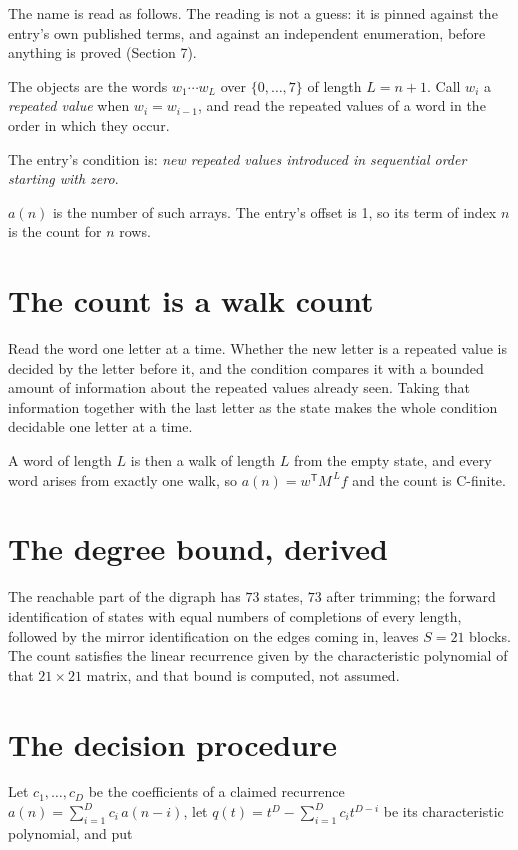 \documentclass[11pt]{article}
\theoremstyle{definition}
\begin{document}
The name is read as follows. The reading is not a guess: it is pinned against the entry's own published terms, and against an independent enumeration, before anything is proved (Section 7).

The objects are the words $w_1\cdots w_L$ over $\{0,\dots,7\}$ of length $L = n + 1$. Call $w_i$ a {\itshape repeated value} when $w_i = w_{i-1}$, and read the repeated values of a word in the order in which they occur.

The entry's condition is: {\itshape new repeated values introduced in sequential order starting with zero}.

$a(n)$ is the number of such arrays. The entry's offset is 1, so its term of index $n$ is the count for $n$ rows.

\section{The count is a walk count}

Read the word one letter at a time. Whether the new letter is a repeated value is decided by the letter before it, and the condition compares it with a bounded amount of information about the repeated values already seen. Taking that information together with the last letter as the state makes the whole condition decidable one letter at a time.

A word of length $L$ is then a walk of length $L$ from the empty state, and every word arises from exactly one walk, so $a(n) = w^{\mathsf T}M^{\,L}f$ and the count is C-finite.

\section{The degree bound, derived}

The reachable part of the digraph has $73$ states, $73$ after trimming; the forward identification of states with equal numbers of completions of every length, followed by the mirror identification on the edges coming in, leaves $S = 21$ blocks. The count satisfies the linear recurrence given by the characteristic polynomial of that $21\times21$ matrix, and that bound is computed, not assumed.

\section{The decision procedure}

Let $c_1,\dots,c_D$ be the coefficients of a claimed recurrence $a(n) = \sum_{i=1}^{D} c_i\,a(n-i)$, let $q(t) = t^{D} - \sum_{i=1}^{D} c_i t^{D-i}$ be its characteristic polynomial, and put
\end{document}
